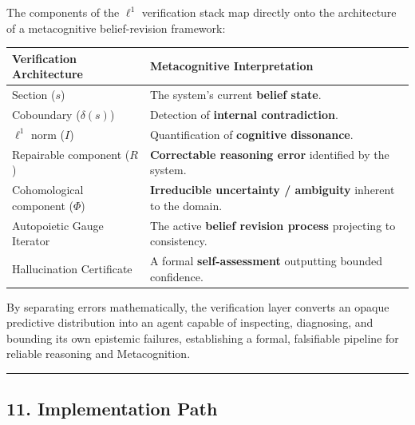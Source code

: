 \documentclass[
]{article}
\begin{document}
The components of the \(\ell^1\) verification stack map directly onto
the architecture of a metacognitive belief-revision framework:

\begin{longtable}[]{@{}
  >{\raggedright\arraybackslash}p{}
  >{\raggedright\arraybackslash}p{}@{}}
\toprule\noalign{}
\begin{minipage}[b]{\linewidth}\raggedright
Verification Architecture
\end{minipage} & \begin{minipage}[b]{\linewidth}\raggedright
Metacognitive Interpretation
\end{minipage} \\
\midrule\noalign{}
\endhead
\bottomrule\noalign{}
\endlastfoot
Section (\(s\)) & The system's current \textbf{belief state}. \\
Coboundary (\(\delta(s)\)) & Detection of \textbf{internal
contradiction}. \\
\(\ell^1\) norm (\(I\)) & Quantification of \textbf{cognitive
dissonance}. \\
Repairable component (\(R\)) & \textbf{Correctable reasoning error}
identified by the system. \\
Cohomological component (\(\Phi\)) & \textbf{Irreducible uncertainty /
ambiguity} inherent to the domain. \\
Autopoietic Gauge Iterator & The active \textbf{belief revision process}
projecting to consistency. \\
Hallucination Certificate & A formal \textbf{self-assessment} outputting
bounded confidence. \\
\end{longtable}

By separating errors mathematically, the verification layer converts an
opaque predictive distribution into an agent capable of inspecting,
diagnosing, and bounding its own epistemic failures, establishing a
formal, falsifiable pipeline for reliable reasoning and Metacognition.

\begin{center}\rule{0.5\linewidth}{0.5pt}\end{center}

\subsection{11. Implementation Path}\label{implementation-path}
\end{document}
